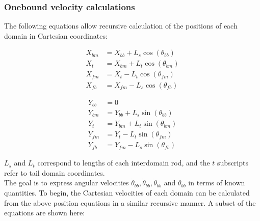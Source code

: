 \documentclass[
11pt, %
english, %
singlespacing, %
headsepline, %
chapterinoneline, %
]{MastersDoctoralThesis} %
\begin{document}
\subsubsection{Onebound velocity calculations}

The following equations allow recursive calculation of the positions of each domain in Cartesian coordinates:

\noindent\begin{minipage}{0.49\linewidth}
\begin{align}
  X_{bm} &= X_{bb}+L_{s}\cos(\theta_{bb}) \\
  X_{t}  &= X_{bm}+L_{t}\cos(\theta_{bm}) \\
  X_{fm} &= X_{t} - L_{t}\cos(\theta_{fm}) \\
  X_{fb} &= X_{fm} - L_{s}\cos(\theta_{fb})
\end{align}
\end{minipage}
\begin{minipage}{0.49\linewidth}
\begin{align}
  Y_{bb} &= 0 \\
  Y_{bm} &= Y_{bb}+L_{s}\sin(\theta_{bb}) \\
  Y_{t}  &= Y_{bm}+L_{t}\sin(\theta_{bm}) \\
  Y_{fm} &= Y_{t} - L_{t}\sin(\theta_{fm}) \\
  Y_{fb} &= Y_{fm} - L_{s}\sin(\theta_{fb})
\end{align}
\end{minipage}
\vspace{.5cm}

$L_s$ and $L_t$ correspond to lengths of each interdomain rod, and the $t$ subscripts refer to tail domain coordinates.\\

The goal is to express angular velocities $\dot{\theta}_{bb}, \dot{\theta}_{bb}, \dot{\theta}_{bb}$ and $\dot{\theta}_{bb}$ in terms of known quantities. To begin, the Cartesian velocities of each domain can be calculated from the above position equations in a similar recursive manner. A subset of the equations are shown here:
\end{document}
